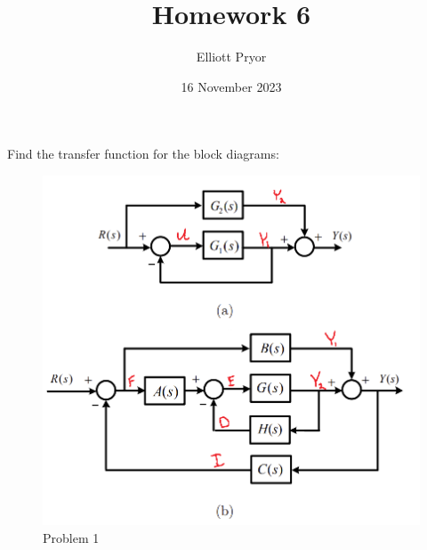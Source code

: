 \documentclass[11pt]{article}
\title{Homework 6}
\author{Elliott Pryor}
\date{16 November 2023}
\begin{document}
\maketitle

Find the transfer function for the block diagrams:
\begin{figure}[h] 
    \centering
    \includegraphics[width=0.55 \linewidth]{prob1}
    \caption{Problem 1}
    \label{fig:p1}
\end{figure}

\soln
\end{document}
